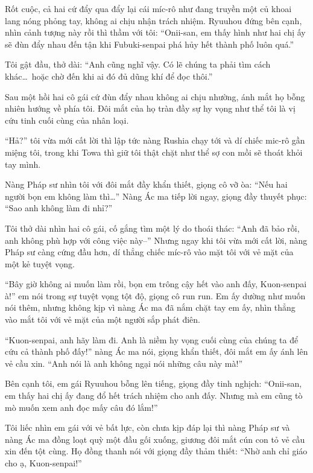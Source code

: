 \documentclass[../main.tex]{subfiles}
\begin{document}
Rốt cuộc, cả hai cứ đẩy qua đẩy lại cái míc-rô như đang truyền một củ khoai lang nóng phỏng tay, không ai chịu nhận trách nhiệm. Ryuuhou đứng bên cạnh, nhìn cảnh tượng này rồi thì thầm với tôi: ``Onii-san, em thấy hình như hai chị ấy sẽ đùn đẩy nhau đến tận khi Fubuki-senpai phá hủy hết thành phố luôn quá.''

Tôi gật đầu, thở dài: ``Anh cũng nghĩ vậy. Có lẽ chúng ta phải tìm cách khác\dots\ hoặc chờ đến khi ai đó đủ dũng khí để đọc thôi.''

Sau một hồi hai cô gái cứ đùn đẩy nhau không ai chịu nhường, ánh mắt họ bỗng nhiên hướng về phía tôi. Đôi mắt của họ tràn đầy sự hy vọng như thể tôi là vị cứu tinh cuối cùng của nhân loại.

``Hả?'' tôi vừa mới cất lời thì lập tức nàng Rushia chạy tới và dí chiếc mic-rô gần miệng tôi, trong khi Towa thì giữ tôi thật chặt như thể sợ con mồi sẽ thoát khỏi tay mình.

Nàng Pháp sư nhìn tôi với đôi mắt đầy khẩn thiết, giọng cô vỡ òa: ``Nếu hai người bọn em không làm thì\dots'' Nàng Ác ma tiếp lời ngay, giọng đầy thuyết phục: ``Sao anh không làm đi nhỉ?''

Tôi thở dài nhìn hai cô gái, cố gắng tìm một lý do thoái thác: ``Anh đã bảo rồi, anh không phù hợp với công việc này--'' Nhưng ngay khi tôi vừa mới cất lời, nàng Pháp sư càng cứng đầu hơn, dí thẳng chiếc míc-rô vào mặt tôi với vẻ mặt của một kẻ tuyệt vọng.

``Bây giờ không ai muốn làm rồi, bọn em trông cậy hết vào anh đấy, Kuon-senpai à!'' em nói trong sự tuyệt vọng tột độ, giọng cô run run. Em ấy dường như muốn nói thêm, nhưng không kịp vì nàng Ác ma đã nắm chặt tay em ấy, nhìn thẳng vào mắt tôi với vẻ mặt của một người sắp phát điên.

``Kuon-senpai, anh hãy làm đi. Anh là niềm hy vọng cuối cùng của chúng ta để cứu cả thành phố đấy!'' nàng Ác ma nói, giọng khẩn thiết, đôi mắt em ấy ánh lên vẻ cầu xin. ``Anh nói là anh không ngại nói những câu này mà!''

Bên cạnh tôi, em gái Ryuuhou bỗng lên tiếng, giọng đầy tinh nghịch: ``Onii-san, em thấy hai chị ấy đang đổ hết trách nhiệm cho anh đấy. Nhưng mà em cũng tò mò muốn xem anh đọc mấy câu đó lắm!''

Tôi liếc nhìn em gái với vẻ bất lực, còn chưa kịp đáp lại thì nàng Pháp sư và nàng Ác ma đồng loạt quỳ một đầu gối xuống, giương đôi mắt cún con tỏ vẻ cầu xin đến tột cùng. Họ đồng thanh nói với giọng đầy thảm thiết: ``Nhờ anh chỉ giáo cho ạ, Kuon-senpai!''
\end{document}
